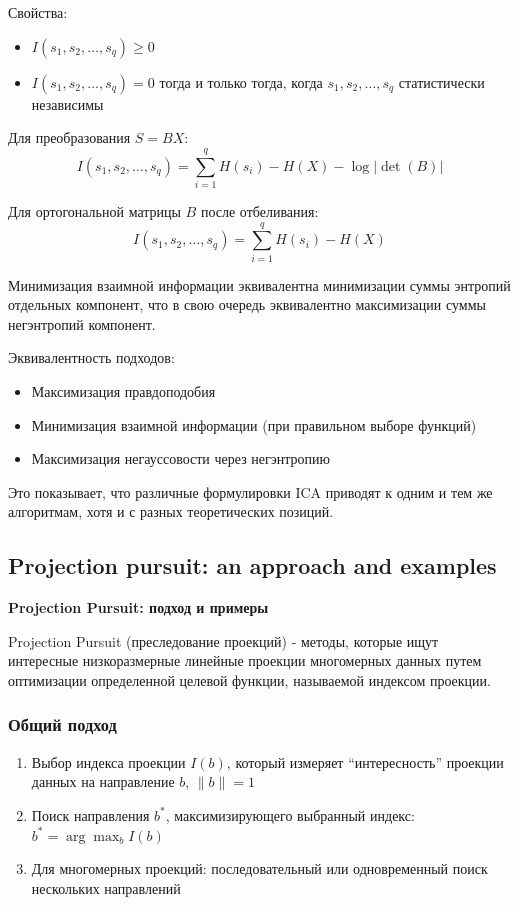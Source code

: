 \documentclass[a4paper,12pt]{article}
\begin{document}
Свойства:
\begin{itemize}
    \item $I(s_1, s_2, \ldots, s_q) \geq 0$ 
    \item $I(s_1, s_2, \ldots, s_q) = 0$ тогда и только тогда, когда $s_1, s_2, \ldots, s_q$ статистически независимы
\end{itemize}

Для преобразования $S = BX$:
$$I(s_1, s_2, \ldots, s_q) = \sum_{i=1}^q H(s_i) - H(X) - \log|\det(B)|$$

Для ортогональной матрицы $B$ после отбеливания:
$$I(s_1, s_2, \ldots, s_q) = \sum_{i=1}^q H(s_i) - H(X)$$

Минимизация взаимной информации эквивалентна минимизации суммы энтропий отдельных компонент, что в свою очередь эквивалентно максимизации суммы негэнтропий компонент.

Эквивалентность подходов:
\begin{itemize}
    \item Максимизация правдоподобия
    \item Минимизация взаимной информации (при правильном выборе функций)
    \item Максимизация негауссовости через негэнтропию
\end{itemize}

Это показывает, что различные формулировки ICA приводят к одним и тем же алгоритмам, хотя и с разных теоретических позиций.

\subsection{Projection pursuit: an approach and examples}

\textbf{Projection Pursuit: подход и примеры}

Projection Pursuit (преследование проекций) - методы, которые ищут интересные низкоразмерные линейные проекции многомерных данных путем оптимизации определенной целевой функции, называемой индексом проекции.

\subsubsection{Общий подход}
\begin{enumerate}
    \item Выбор индекса проекции $I(b)$, который измеряет ``интересность'' проекции данных на направление $b$, $\|b\| = 1$
    \item Поиск направления $b^*$, максимизирующего выбранный индекс: $b^* = \arg\max_b I(b)$
    \item Для многомерных проекций: последовательный или одновременный поиск нескольких направлений
\end{enumerate}
\end{document}
